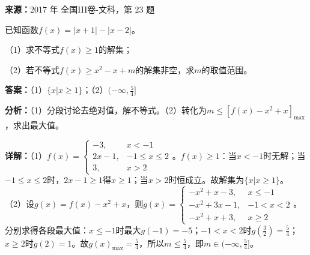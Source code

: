 \begin{question}[points=10]
\textbf{来源：}2017 年 全国III卷-文科，第 23 题\par
[选修4-5：不等式选讲]

已知函数$f(x)=|x+1|-|x-2|$。

（1）求不等式$f(x)\ge 1$的解集；

（2）若不等式$f(x)\ge x^2-x+m$的解集非空，求$m$的取值范围。
\begin{solution}
\textbf{答案：}（1）$\{x|x\ge 1\}$；（2）$(-\infty,\frac{5}{4}]$

\textbf{分析：}（1）分段讨论去绝对值，解不等式。（2）转化为$m\le [f(x)-x^2+x]_{\max}$，求出最大值。

\textbf{详解：}（1）$f(x)=\begin{cases} -3,&x<-1\\ 2x-1,&-1\le x\le 2\\ 3,&x>2 \end{cases}$。$f(x)\ge 1$：当$x<-1$时无解；当$-1\le x\le 2$时，$2x-1\ge 1$得$x\ge 1$；当$x>2$时恒成立。故解集为$\{x|x\ge 1\}$。
（2）设$g(x)=f(x)-x^2+x$，则$g(x)=\begin{cases} -x^2+x-3,&x\le -1\\ -x^2+3x-1,&-1<x<2\\ -x^2+x+3,&x\ge 2 \end{cases}$。分别求得各段最大值：$x\le -1$时最大$g(-1)=-5$；$-1<x<2$时$g(\frac{3}{2})=\frac{5}{4}$；$x\ge 2$时$g(2)=1$。故$g(x)_{\max}=\frac{5}{4}$，所以$m\le \frac{5}{4}$，即$m\in(-\infty,\frac{5}{4}]$。
\end{solution}
\end{question}

